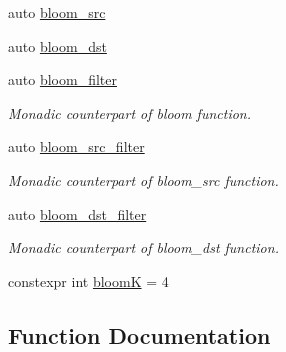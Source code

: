 \begin{DoxyCompactItemize}
auto \hyperlink{namespacepfq_1_1lang_1_1anonymous__namespace_02default_8hpp_03_aa2a8ff506d61e93d8eca4419513970f4}{bloom\+\_\+src}
\item 
auto \hyperlink{namespacepfq_1_1lang_1_1anonymous__namespace_02default_8hpp_03_ac1c667000a13acfbda8490d5748b91c4}{bloom\+\_\+dst}
\item 
auto \hyperlink{namespacepfq_1_1lang_1_1anonymous__namespace_02default_8hpp_03_a3a5eda5d7a49e279941725df8388378d}{bloom\+\_\+filter}
\begin{DoxyCompactList}\small\item\em Monadic counterpart of {\ttfamily bloom} function. \end{DoxyCompactList}\item 
auto \hyperlink{namespacepfq_1_1lang_1_1anonymous__namespace_02default_8hpp_03_a04d4dfefacab3230f7d17f0f797cd37e}{bloom\+\_\+src\+\_\+filter}
\begin{DoxyCompactList}\small\item\em Monadic counterpart of {\ttfamily bloom\+\_\+src} function. \end{DoxyCompactList}\item 
auto \hyperlink{namespacepfq_1_1lang_1_1anonymous__namespace_02default_8hpp_03_a71aa2d21ceb343786b3911801eb0741b}{bloom\+\_\+dst\+\_\+filter}
\begin{DoxyCompactList}\small\item\em Monadic counterpart of {\ttfamily bloom\+\_\+dst} function. \end{DoxyCompactList}\item 
constexpr int \hyperlink{namespacepfq_1_1lang_1_1anonymous__namespace_02default_8hpp_03_a56750cdea1537acfa24c256b64924004}{bloomK} = 4
\end{DoxyCompactItemize}


\subsection{Function Documentation}
